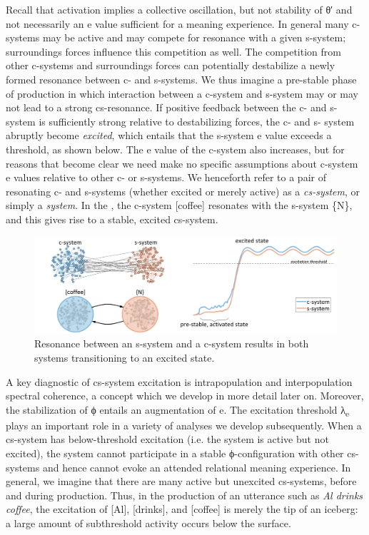   Recall that activation implies a collective oscillation, but not stability of θ′ and not necessarily an e value sufficient for a meaning experience. In general many c-systems may be active and may compete for resonance with a given s-system; surroundings forces influence this competition as well. The competition from other c-systems and surroundings forces can potentially destabilize a newly formed resonance between c- and s-systems. We thus imagine a pre-stable phase of production in which interaction between a c-system and s-system may or may not lead to a strong cs-resonance. If positive feedback between the c- and s-system is sufficiently strong relative to destabilizing forces, the c- and s- system abruptly become \textit{excited}, which entails that the s-system e value exceeds a threshold, as shown below. The e value of the c-system also increases, but for reasons that become clear we need make no specific assumptions about c-system e values relative to other c- or s-systems. We henceforth refer to a pair of resonating c- and s-systems (whether excited or merely active) as a \textit{cs-system}, or simply a \textit{system}. In the {}, the c-system [coffee] resonates with the s-system \{N\}, and this gives rise to a stable, excited cs-system.

  
\begin{figure}
\includegraphics[width=\textwidth]{figures/Tilsen-img17.png}
\caption{Resonance between an s-system and a c-system results in both systems transitioning to an excited state.}
\label{fig:2:10}
\end{figure}
 
  A key diagnostic of cs-system excitation is intrapopulation and interpopulation spectral coherence, a concept which we develop in more detail later on. Moreover, the stabilization of ϕ entails an augmentation of e. The excitation threshold λ\textsubscript{e} plays an important role in a variety of analyses we develop subsequently. When a cs-system has below-threshold excitation (i.e. the system is active but not excited), the system cannot participate in a stable ϕ-configuration with other cs-systems and hence cannot evoke an attended relational meaning experience. In general, we imagine that there are many active but unexcited cs-systems, before and during production. Thus, in the production of an utterance such as \textit{Al drinks coffee}, the excitation of [Al], [drinks], and [coffee] is merely the tip of an iceberg: a large amount of subthreshold activity occurs below the surface.

